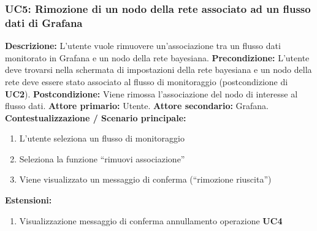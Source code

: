                 \subsubsection{UC5: Rimozione di un nodo della rete associato ad un flusso dati di Grafana}
                    \textbf{Descrizione:} L'utente vuole rimuovere un'associazione tra un flusso dati monitorato in Grafana e un nodo della rete bayesiana.
                    \newline
                    \textbf{Precondizione:} L’utente deve trovarsi nella schermata di impostazioni della rete bayesiana e un nodo della rete deve essere stato associato al flusso di monitoraggio (postcondizione di \textbf{UC2}).
                    \newline
                    \textbf{Postcondizione:} Viene rimossa l’associazione del nodo di interesse al flusso dati.
                    \newline
                    \textbf{Attore primario:} Utente.
                    \newline
                    \textbf{Attore secondario:} Grafana.
                    \newline
                    \textbf{Contestualizzazione / Scenario principale:} \begin{enumerate}
                            \item L’utente seleziona un flusso di monitoraggio
                            \item Seleziona la funzione “rimuovi associazione” 
                            \item Viene visualizzato un messaggio di conferma (“rimozione riuscita”)
                        \end{enumerate}
                    
                    \textbf{Estensioni:} 
                    \begin{enumerate}
                            \item Visualizzazione messaggio di conferma annullamento operazione \textbf{UC4}
                        \end{enumerate}
                        
